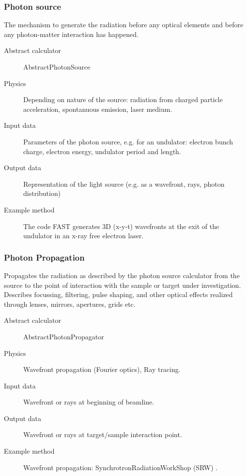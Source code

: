 \documentclass[a4paper]{article}
\begin{document}
\subsubsection{Photon source}
The mechanism to generate the radiation before any optical elements and before any photon-matter interaction has happened.
\begin{description}
  \item[Abstract calculator] AbstractPhotonSource
  \item[Physics] Depending on nature of the source: radiation from charged particle acceleration, spontanuous emission, laser medium.
  \item[Input data] Parameters of the photon source, e.g. for an undulator: electron bunch charge, electron energy, undulator period and length.
  \item[Output data] Representation of the light source (e.g. as a wavefront, rays, photon distribution)
  \item[Example method] The code FAST generates 3D (x-y-t) wavefronts at the exit of the undulator in an x-ray free electron laser.
\end{description}
\subsubsection{Photon Propagation}
Propagates the radiation as described by the photon source calculator from the source to the point of interaction with the sample or target under
    investigation. Describes focussing, filtering, pulse shaping,
    and other optical effects realized through lenses, mirrors, apertures, grids etc.
\begin{description}
  \item[Abstract calculator] AbstractPhotonPropagator
  \item[Physics] Wavefront propagation (Fourier optics), Ray tracing.
  \item[Input data] Wavefront or rays at beginning of beamline.
  \item[Output data] Wavefront or rays at target/sample interaction point.
  \item[Example method] Wavefront propagation: SynchrotronRadiationWorkShop (SRW) \cite{}.
\end{description}
\end{document}
